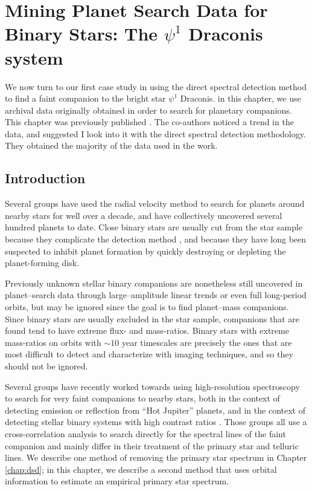 

\chapter{Mining Planet Search Data for Binary Stars: The $\psi^1$ Draconis system}
\label{chap:psi1dra}
We now turn to our first case study in using the direct spectral detection method to find a faint companion to the bright star $\psi^1$ Draconis. in this chapter, we use archival data originally obtained in order to search for planetary companions. This chapter was previously published \citep{Gullikson2015}. The co-authors noticed a trend in the data, and suggested I look into it with the direct spectral detection methodology. They obtained the majority of the data used in the work.

\section{Introduction}
\label{paper4_sec:intro}
Several groups \citep[e.g.][]{Wittenmyer2006, Fischer2009, Pepe2011} have used the radial velocity method to search for planets around nearby stars for well over a decade, and have collectively uncovered several hundred planets to date. Close binary stars are usually cut from the star sample because they complicate the detection method \citep[e.g.][]{Bergmann2015}, and because they have long been suspected to inhibit planet formation by quickly destroying \citep{Kraus2012} or depleting \citep{Harris2012} the planet-forming disk.

Previously unknown stellar binary companions are nonetheless still uncovered in planet--search data through large--amplitude linear trends or even full long-period orbits, but may be ignored since the goal is to find planet--mass companions. Since binary stars are usually excluded in the star sample, companions that are found tend to have extreme flux- and mass-ratios. Binary stars with extreme mass-ratios on orbits with $\sim 10$ year timescales are precisely the ones that are most difficult to detect and characterize with imaging techniques, and so they should not be ignored.

Several groups have recently worked towards using high-resolution spectroscopy to search for very faint companions to nearby stars, both in the context of detecting emission \citep{Snellen2010, Gullikson2013} or reflection \citep{Martins2013} from ``Hot Jupiter'' planets, and in the context of detecting stellar binary systems with high contrast ratios \citep[e.g.][]{Gullikson2013_2, Kolbl2015}. Those groups all use a cross-correlation analysis to search directly for the spectral lines of the faint companion and mainly differ in their treatment of the primary star and telluric lines. We describe one method of removing the primary star spectrum in Chapter \ref{chap:dsd}; in this chapter, we describe a second method that uses orbital information to estimate an empirical primary star spectrum.

